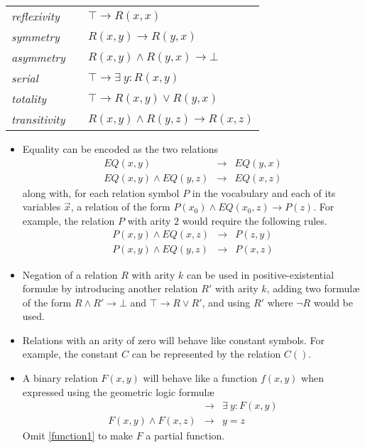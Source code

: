 			\begin{tabular}{lll}
			\emph{reflexivity}   & \qquad & $\top \to R(x,x)$                  \\
			\emph{symmetry}      & \qquad & $R(x,y) \to R(y,x)$                \\
			\emph{asymmetry}     & \qquad & $R(x,y) \wedge R(y,x) \to \bot$    \\
			\emph{serial}        & \qquad & $\top \to \exists\ y : R(x,y)$     \\
			\emph{totality}      & \qquad & $\top \to R(x,y) \vee R(y,x)$      \\
			\emph{transitivity}  & \qquad & $R(x,y) \wedge R(y,z) \to R(x,z)$
			\end{tabular}

			\begin{itemize}
			\item
			Equality can be encoded as the two relations
				\begin{eqnarray*}
				EQ(x,y)                & \to & EQ(y,x)  \\
				EQ(x,y) \wedge EQ(y,z) & \to & EQ(x,z)
				\end{eqnarray*}
			along with, for each relation symbol $P$ in the vocabulary and each
			of its variables $\vec x$, a relation of the form $P(x_0) \wedge
			EQ(x_0,z) \to P(z)$. For example, the relation $P$ with arity $2$
			would require the following rules.
				\begin{eqnarray*}
				P(x,y) \wedge EQ(x,z) & \to & P(z,y)  \\
				P(x,y) \wedge EQ(y,z) & \to & P(x,z)
				\end{eqnarray*}

			\item
			Negation of a relation $R$ with arity $k$ can be used in
			positive-existential formul{\ae} by introducing another relation
			$R'$ with arity $k$, adding two formul{\ae} of the form $R \wedge
			R' \to \bot$ and $\top \to R \vee R'$, and using $R'$ where $\neg
			R$ would be used.

			\item
			Relations with an arity of zero will behave like constant symbols.
			For example, the constant $C$ can be represented by the relation
			$C()$.

			\item
			A binary relation $F(x,y)$ will behave like a function $f(x,y)$ when expressed using the geometric logic formul{\ae}
			\begin{eqnarray}
			\label{function1}
				{}                   & \to & \exists\ y : F(x,y)  \\
			\label{function2}
				F(x,y) \wedge F(x,z) & \to & y = z
			\end{eqnarray}
			Omit \eqref{function1} to make $F$ a partial function.
			\end{itemize}
